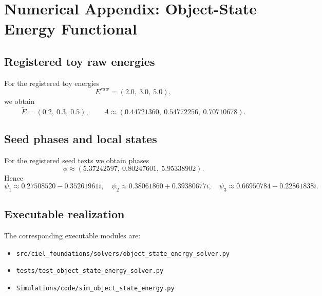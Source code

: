 \appendix
\section{Numerical Appendix: Object-State Energy Functional}
\label{app:object-state-energy}

\subsection{Registered toy raw energies}
For the registered toy energies
\begin{equation}
E^{raw}=(2.0,\ 3.0,\ 5.0),
\end{equation}
we obtain
\begin{equation}
\widetilde E=(0.2,\ 0.3,\ 0.5),
\qquad
A\approx (0.44721360,\ 0.54772256,\ 0.70710678).
\end{equation}

\subsection{Seed phases and local states}
For the registered seed texts we obtain phases
\begin{equation}
\phi\approx(5.37242597,\ 0.80247601,\ 5.95338902).
\end{equation}
Hence
\begin{equation}
\psi_1\approx 0.27508520-0.35261961i,
\quad
\psi_2\approx 0.38061860+0.39380677i,
\quad
\psi_3\approx 0.66950784-0.22861838i.
\end{equation}

\subsection{Executable realization}
The corresponding executable modules are:
\begin{itemize}
  \item \texttt{src/ciel\_foundations/solvers/object\_state\_energy\_solver.py}
  \item \texttt{tests/test\_object\_state\_energy\_solver.py}
  \item \texttt{Simulations/code/sim\_object\_state\_energy.py}
\end{itemize}
